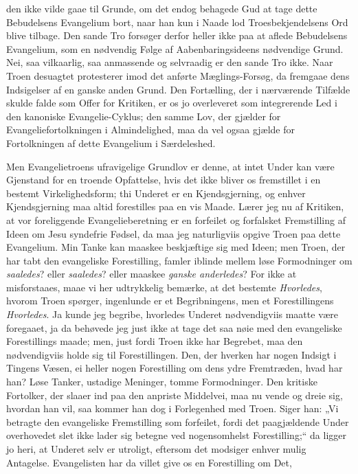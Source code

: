 \documentclass[12pt,a4paper]{book}
\begin{document}
den ikke vilde gaae til Grunde, om det endog behagede Gud at tage dette
Bebudelsens Evangelium bort, naar han kun i Naade lod Troesbekjendelsens Ord
blive tilbage. Den sande Tro forsøger derfor heller ikke paa at aflede
Bebudelsens Evangelium, som en nødvendig Følge af Aabenbaringsideens
nødvendige Grund. Nei, saa vilkaarlig, saa anmassende og selvraadig er den
sande Tro ikke. Naar Troen desuagtet protesterer imod det anførte
Mæglings-Forsøg, da fremgaae dens Indsigelser af en ganske anden Grund. Den
Fortælling, der i nærværende Tilfælde skulde falde som Offer for Kritiken, er
os jo overleveret som integrerende Led i den kanoniske Evangelie-Cyklus; den
samme Lov, der gjælder for Evangeliefortolkningen i Almindelighed, maa da vel
ogsaa gjælde for Fortolkningen af dette Evangelium i Særdeleshed.

Men Evangelietroens ufravigelige Grundlov er denne, at intet Under kan være
Gjenstand for en troende Opfattelse, hvis det ikke bliver os fremstillet i en
bestemt Virkelighedsform; thi Underet er en Kjendsgjerning, og enhver
Kjendsgjerning maa altid forestilles paa en vis Maade. Lærer jeg nu af
Kritiken, at vor foreliggende Evangelieberetning er en forfeilet og forfalsket
Fremstilling af Ideen om Jesu syndefrie Fødsel, da maa jeg naturligviis opgive
Troen paa dette Evangelium. Min Tanke kan maaskee beskjæftige sig med Ideen;
men Troen, der har tabt den evangeliske Forestilling, famler iblinde mellem
løse Formodninger om \emph{saaledes}? eller \emph{saaledes}? eller maaskee
\emph{ganske anderledes}? For ikke at misforstaaes, maae vi her udtrykkelig
bemærke, at det bestemte \emph{Hvorledes}, hvorom Troen spørger, ingenlunde er
et Begribningens, men et Forestillingens \emph{Hvorledes}. Ja kunde jeg
begribe, hvorledes Underet nødvendigviis maatte være foregaaet, ja da behøvede
jeg just ikke at tage det saa nøie med den evangeliske Forestillings\-%
maade; men, just fordi Troen ikke har Begrebet, maa den nødvendigviis holde
sig til Forestillingen. Den, der hverken har nogen Indsigt i Tingens Væsen, ei
heller nogen Forestilling om dens ydre Fremtræden, hvad har han? Løse Tanker,
ustadige Meninger, tomme Formodninger. Den kritiske Fortolker, der slaaer ind
paa den anpriste Middelvei, maa nu vende og dreie sig, hvordan han vil, saa
kommer han dog i Forlegenhed med Troen. Siger han: „Vi betragte den
evangeliske Fremstilling som forfeilet, fordi det paagjældende Under
overhovedet slet ikke lader sig betegne ved nogensomhelst Forestilling;“ da
ligger jo heri, at Underet selv er utroligt, eftersom det modsiger enhver
mulig Antagelse. Evangelisten har da villet give os en Forestilling om Det,
\end{document}
